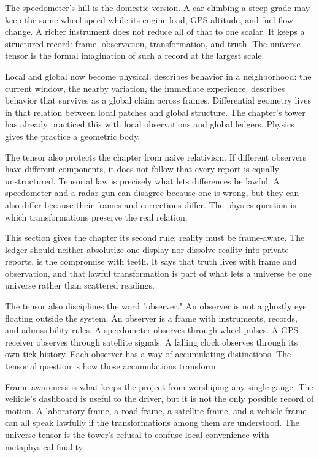 The speedometer's hill is the domestic version. A car climbing a steep grade
may keep the same wheel speed while its engine load, GPS altitude, and fuel
flow change. A richer instrument does not reduce all of that to one scalar. It
keeps a structured record: frame, observation, transformation, and truth. The
universe tensor is the formal imagination of such a record at the largest
scale.

Local and global now become physical.  describes behavior in a
neighborhood: the current window, the nearby variation, the immediate
experience.  describes behavior that survives as a global claim
across frames. Differential geometry lives in that relation between local
patches and global structure. The chapter's tower has already practiced this
with local observations and global ledgers. Physics gives the practice a
geometric body.

The tensor also protects the chapter from naive relativism. If different
observers have different components, it does not follow that every report is
equally unstructured. Tensorial law is precisely what lets differences be
lawful. A speedometer and a radar gun can disagree because one is wrong, but
they can also differ because their frames and corrections differ. The physics
question is which transformations preserve the real relation.

This section gives the chapter its second rule: reality must be frame-aware.
The ledger should neither absolutize one display nor dissolve reality into
private reports.  is the compromise with teeth. It says
that truth lives with frame and observation, and that lawful transformation is
part of what lets a universe be one universe rather than scattered readings.

The tensor also disciplines the word "observer." An observer is not a ghostly
eye floating outside the system. An observer is a frame with instruments,
records, and admissibility rules. A speedometer observes through wheel pulses.
A GPS receiver observes through satellite signals. A falling clock observes
through its own tick history. Each observer has a way of accumulating
distinctions. The tensorial question is how those accumulations transform.

Frame-awareness is what keeps the project from worshiping any single gauge.
The vehicle's dashboard is useful to the driver, but it is not the only
possible record of motion. A laboratory frame, a road frame, a satellite frame,
and a vehicle frame can all speak lawfully if the transformations among them
are understood. The universe tensor is the tower's refusal to confuse local
convenience with metaphysical finality.

